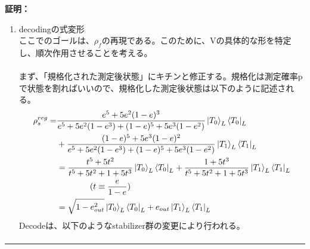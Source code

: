 \documentclass[a4paper,10.5pt]{article}
\numberwithin{equation}{section}
\newenvironment{proofbox}
{\begin{prooflabel}\textbf{証明：}\end{prooflabel}\vspace{0.8em}}
{\par\vspace{1em}\hrule\vspace{1em}}
\begin{document}
\begin{proofbox}
\begin{enumerate}
    \begin{align*}
        \rho_{s}=\Pi \rho_{in} \Pi^{\dagger} 
        &=(\frac{e^{5}}{6}+e^{2}(1-e^{3})\sum_{|x|=2}|a_{x}|^{2})\ket{T}_{L}\bra{T}_{L}\\
        &+(\frac{(1-e)^{5}}{6}+e^{3}(1-e^{2})\sum_{|x|=3}|b_{x}|^{2})\ket{T_{1}}_{L}\bra{T_{1}}_{L}
    \end{align*}
    $\sum_{x}|a_{x}^{2}|,|b_{x}^{2}|$の値は、以下の恒等式から理解できる。
    \begin{align*}
    &\ket{T_{0}}_{L}\bra{T_{0}}_{L}+\ket{T_{1}}_{L}\bra{T_{1}}_{L}=\Pi(\ket{T_{0}}_{L}\bra{T_{0}}_{L}+\ket{T_{1}}_{L}\bra{T}_{L})\Pi=\Pi\\
    &\implies \sum_{x}|a_{x}^{2}|=\sum_{x}|b_{x}^{2}|=\frac{5}{6}
    \end{align*}
    以上をすべて踏まえると、Projection作用後のstateを以下として導ける。
     \begin{align*}
            \rho_{s}=\frac{e^{5}+5e^{2}(1-e)^{3}}{6}\ket{T_{0}}_{L}\bra{T_{0}}_{L}+\frac{(1-e)^{5}+5e^{3}(1-e)^{2}}{6}\ket{T_{1}}_{L}\bra{T_{1}}_{L}\\
    \end{align*}
    \item decodingの式変形\\
    ここでのゴールは、$\rho_{f}$の再現である。このために、Vの具体的な形を特定し、順次作用させることを考える。\\
    \\
    まず、「規格化された測定後状態」にキチンと修正する。規格化は測定確率pで状態を割ればいいので、規格化した測定後状態は以下のように記述される。
    \begin{align*}
        \rho_{s}^{reg}=&\frac{e^{5}+5e^{2}(1-e)^{3}}{e^{5}+5e^{2}(1-e^{3})+(1-e)^{5}+5e^{3}(1-e^{2})}\ket{T_{0}}_{L}\bra{T_{0}}_{L}\\
        &+\frac{(1-e)^{5}+5e^{3}(1-e)^{2}}{e^{5}+5e^{2}(1-e^{3})+(1-e)^{5}+5e^{3}(1-e^{2})}\ket{T_{1}}_{L}\bra{T_{1}}_{L}\\
        &=\frac{t^{5}+5t^{2}}{t^{5}+5t^{2}+1+5t^{3}}\ket{T_{0}}_{L}\bra{T_{0}}_{L}+\frac{1+5t^{3}}{t^{5}+5t^{2}+1+5t^{3}}\ket{T_{1}}_{L}\bra{T_{1}}_{L}\\&\quad\quad\quad\quad(t\equiv \frac{e}{1-e})\\
        &=\sqrt{1-e_{out}^{2}}\ket{T_{0}}_{L}\bra{T_{0}}_{L}+e_{out}\ket{T_{1}}_{L}\bra{T_{1}}_{L} 
    \end{align*}
    Decodeは、以下のようなstabilizer群の変更により行われる。
    \begin{align*}

\end{align*}
\end{enumerate}
\end{proofbox}
\end{document}
